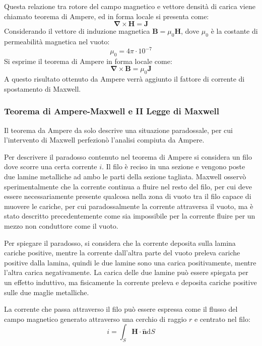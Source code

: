 \documentclass{article}
\newcommand{\vect}[1]{\boldsymbol{\mathbf{#1}}}
\newcommand{\df}{\mathrm{d}}
\numberwithin{equation}{subsection}
\begin{document}
Questa relazione tra rotore del campo magnetico e vettore densità di carica viene chiamato teorema di Ampere, ed in forma locale si presenta come:
\begin{equation*}
    \vect\nabla\times\vect{H}=\vect{J}
\end{equation*}
Considerando il vettore di induzione magnetica $\vect{B}=\mu_0\vect{H}$, dove $\mu_0$ è la costante di permeabilità magnetica nel vuoto:
\begin{equation*}
    \mu_0=4\pi\cdot10^{-7}
\end{equation*}
Si esprime il teorema di Ampere in forma locale come:
\begin{equation}
    \vect\nabla\times\vect{B}=\mu_0\vect{J}
\end{equation}
A questo risultato ottenuto da Ampere verrà aggiunto il fattore di corrente di spostamento di Maxwell. 

\subsubsection{Teorema di Ampere-Maxwell e II Legge di Maxwell}
Il teorema da Ampere da solo descrive una situazione paradossale, per cui l'intervento di Maxwell perfezionò l'analisi compiuta da Ampere. 

Per descrivere il paradosso contenuto nel teorema di Ampere si considera un filo dove scorre una certa corrente $i$. Il filo è reciso in una sezione e vengono poste due 
lamine metalliche ad ambo le parti della sezione tagliata. Maxwell osservò sperimentalmente che la corrente continua a fluire nel resto del filo, per cui deve essere 
necessariamente presente qualcosa nella zona di vuoto tra il filo capace di muovere le cariche, per cui paradossalmente la corrente attraversa il vuoto, ma è stato descritto 
precedentemente come sia impossibile per la corrente fluire per un mezzo non conduttore come il vuoto. 

Per spiegare il paradosso, si considera che la corrente deposita sulla lamina cariche positive, mentre la corrente dall'altra parte del vuoto preleva cariche positive dalla lamina, 
quindi le due lamine sono una carica positivamente, mentre l'altra carica negativamente. La carica delle due lamine può essere spiegata per un effetto induttivo, ma fisicamente 
la corrente preleva e deposita cariche positive sulle due maglie metalliche. 


La corrente che passa attraverso il filo può essere espressa come il flusso del campo magnetico generato attraverso una cerchio di raggio $r$ e centrato nel filo:
\begin{equation*}
    i=\int_S{\vect{H}}\cdot\hat{\vect{n}}\df S
\end{equation*} 
\end{document}
